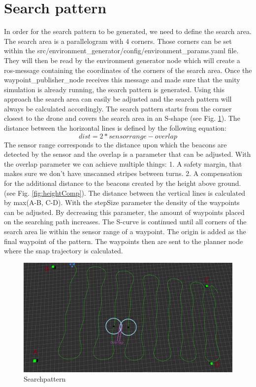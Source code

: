 \documentclass[conference]{IEEEtran}
\begin{document}
\section{Search pattern}
In order for the search pattern to be generated, we need to define the search area. The search area is a parallelogram with 4 corners. Those corners can be set within the src/environment\_generator/config/environment\_params.yaml file. They will then be read by the environment generator node which will create a ros-message containing the coordinates of the corners of the search area. Once the waypoint\_publisher\_node receives this message and made sure that the unity simulation is already running, the search pattern is generated. Using this approach the search area can easily be adjusted and the search pattern will always be calculated accordingly. The search pattern starts from the corner closest to the drone and covers the search area in an S-shape (see Fig. \ref{fig:searchPattern}). The distance between the horizontal lines is defined by the following equation: \begin{equation}
    dist = 2*sensorrange - overlap
\end{equation}
The sensor range corresponds to the distance upon which the beacons are detected by the sensor and the overlap is a parameter that can be adjusted. With the overlap parameter we can achieve multiple things: 1. A safety margin, that makes sure we don’t have unscanned stripes between turns. 2. A compensation for the additional distance to the beacons created by the height above ground. (see Fig. \ref{fig:heightComp}). The distance between the vertical lines is calculated by max(A-B, C-D). With the stepSize parameter the density of the waypoints can be adjusted. By decreasing this parameter, the amount of waypoints placed on the searching path increases. The S-curve is continued until all corners of the search area lie within the sensor range of a waypoint. The origin is added as the final waypoint of the pattern. The waypoints then are sent to the planner node where the snap trajectory is calculated.
\begin{figure}[htbp]
\centerline{\includegraphics[width=1\columnwidth]{Searchpattern_withOverlap.png}}
\caption{Searchpattern}
\label{fig:searchPattern}
\end{figure}
\end{document}
